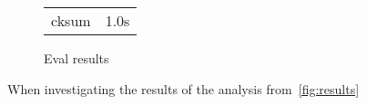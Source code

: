   \begin{figure}
    \begin{tabular}{l|l}
      cksum & 1.0s
    \end{tabular}
    \caption[Eval results]{Eval results}
    \label{fig:results}
  \end{figure}

  When investigating the results of the analysis from~\autoref{fig:results}